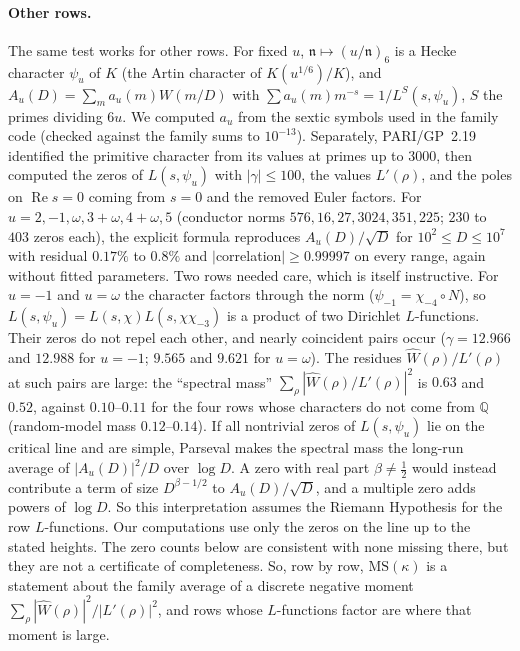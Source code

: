 \documentclass[11pt]{article}
\theoremstyle{remark}
\begin{document}
\paragraph{Other rows.} The same test works for other rows. For fixed $u$, $\mathfrak n\mapsto(u/\mathfrak n)_6$ is a
Hecke character $\psi_u$ of $K$ (the Artin character of $K(u^{1/6})/K$), and
$A_u(D)=\sum_m a_u(m)W(m/D)$ with $\sum a_u(m)m^{-s}=1/L^{S}(s,\psi_u)$, $S$ the primes
dividing $6u$. We computed $a_u$ from the sextic symbols used in the family code (checked
against the family sums to $10^{-13}$). Separately, PARI/GP~2.19 identified the primitive
character from its values at primes up to $3000$, then computed the zeros of $L(s,\psi_u)$ with
$|\gamma|\le100$, the values $L'(\rho)$, and the poles on $\operatorname{Re}s=0$ coming from
$s=0$ and the removed Euler factors. For $u=2,-1,\omega,3+\omega,4+\omega,5$ (conductor norms
$576,16,27,3024,351,225$; $230$ to $403$ zeros each), the explicit formula reproduces
$A_u(D)/\sqrt D$ for $10^2\le D\le10^7$ with residual $0.17\%$ to $0.8\%$ and
$|$correlation$|\ge0.99997$ on every range, again without fitted parameters. Two rows needed
care, which is itself instructive. For $u=-1$ and $u=\omega$ the character factors through the
norm ($\psi_{-1}=\chi_{-4}\circ N$), so $L(s,\psi_u)=L(s,\chi)L(s,\chi\chi_{-3})$ is a product of
two Dirichlet $L$-functions. Their zeros do not repel each other, and nearly coincident pairs
occur ($\gamma=12.966$ and $12.988$ for $u=-1$; $9.565$ and $9.621$ for $u=\omega$). The
residues $\widehat W(\rho)/L'(\rho)$ at such pairs are large: the ``spectral mass''
$\sum_\rho|\widehat W(\rho)/L'(\rho)|^2$ is $0.63$ and $0.52$, against $0.10$--$0.11$ for the
four rows whose characters do not come from $\mathbb Q$ (random-model mass $0.12$--$0.14$).
If all nontrivial zeros of $L(s,\psi_u)$ lie on the critical line and are simple, Parseval
makes the spectral mass the long-run average of $|A_u(D)|^2/D$ over $\log D$. A zero with real
part $\beta\ne\frac12$ would instead contribute a term of size $D^{\beta-1/2}$ to
$A_u(D)/\sqrt D$, and a multiple zero adds powers of $\log D$. So this interpretation assumes
the Riemann Hypothesis for the row $L$-functions. Our computations use only the zeros on the
line up to the stated heights. The zero counts below are consistent with none missing there,
but they are not a certificate of completeness. So, row by row, $\mathrm{MS}(\kappa)$ is a statement about the family average
of a discrete negative moment $\sum_\rho|\widehat W(\rho)|^2/|L'(\rho)|^2$, and rows whose
$L$-functions factor are where that moment is large.
\end{document}
